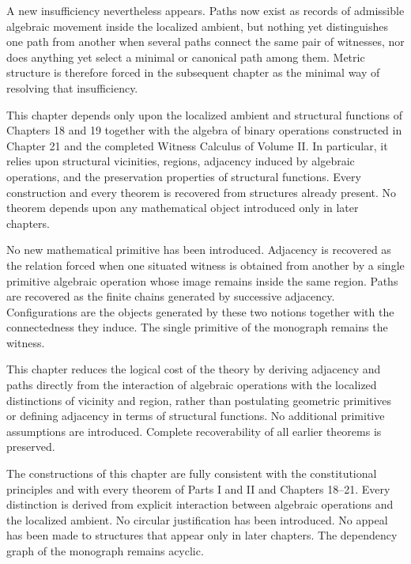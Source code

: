 \documentclass[12pt,anyside]{book}
\begin{document}
A new insufficiency nevertheless appears. Paths now exist as records of admissible algebraic movement inside the localized ambient, but nothing yet distinguishes one path from another when several paths connect the same pair of witnesses, nor does anything yet select a minimal or canonical path among them. Metric structure is therefore forced in the subsequent chapter as the minimal way of resolving that insufficiency.

\begin{dependencyaudit}
This chapter depends only upon the localized ambient and structural functions of Chapters 18 and 19 together with the algebra of binary operations constructed in Chapter 21 and the completed Witness Calculus of Volume II. In particular, it relies upon structural vicinities, regions, adjacency induced by algebraic operations, and the preservation properties of structural functions. Every construction and every theorem is recovered from structures already present. No theorem depends upon any mathematical object introduced only in later chapters.
\end{dependencyaudit}

\begin{primitiveaudit}
No new mathematical primitive has been introduced. Adjacency is recovered as the relation forced when one situated witness is obtained from another by a single primitive algebraic operation whose image remains inside the same region. Paths are recovered as the finite chains generated by successive adjacency. Configurations are the objects generated by these two notions together with the connectedness they induce. The single primitive of the monograph remains the witness.
\end{primitiveaudit}

\begin{reductionaudit}
This chapter reduces the logical cost of the theory by deriving adjacency and paths directly from the interaction of algebraic operations with the localized distinctions of vicinity and region, rather than postulating geometric primitives or defining adjacency in terms of structural functions. No additional primitive assumptions are introduced. Complete recoverability of all earlier theorems is preserved.
\end{reductionaudit}

\begin{consistencyaudit}
The constructions of this chapter are fully consistent with the constitutional principles and with every theorem of Parts I and II and Chapters 18--21. Every distinction is derived from explicit interaction between algebraic operations and the localized ambient. No circular justification has been introduced. No appeal has been made to structures that appear only in later chapters. The dependency graph of the monograph remains acyclic.
\end{consistencyaudit}
\end{document}
